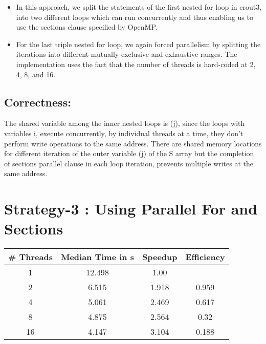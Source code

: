 \documentclass[12pt]{article}
\begin{document}
\begin{itemize}
  \item In this approach, we split the statements of the first nested for loop in crout3, into two different loops which can run concurrently and
  thus enabling us to use the sections clause specified by OpenMP.
  \item For the last triple nested for loop, we again forced parallelism by
  splitting the iterations into different mutually exclusive and exhaustive ranges. The implementation uses the fact that the number of threads is hard-coded at
  2, 4, 8, and 16. 
\end{itemize}

\subsection*{Correctness:}

The shared variable among the inner nested loops is (j), since the loops with variables i, execute concurrently, by individual threads at a time,
they don't perform write operations to the same address. There are shared memory locations for different iteration of the outer variable (j) of the S array
but the completion of sections parallel clause in each loop iteration, prevents multiple writes at the same address.

\newpage

\section*{Strategy-3 : Using Parallel For and Sections}

\begin{table}[h!]
    \begin{center}
      \begin{tabular}{|c|c|c|c|} %
      \hline
      \textbf{\# Threads} & \textbf{Median Time in s} & \textbf{Speedup} & \textbf{Efficiency}\\
        \hline  
        1 & 12.498 & 1.00 \\
        2 & 6.515 & 1.918 & 0.959\\
        4 & 5.061 & 2.469 & 0.617\\
        8 & 4.875 & 2.564 & 0.32\\
        16 & 4.147 & 3.104 & 0.188\\
        \hline
      \end{tabular}
    \end{center}
  \end{table}
\end{document}
